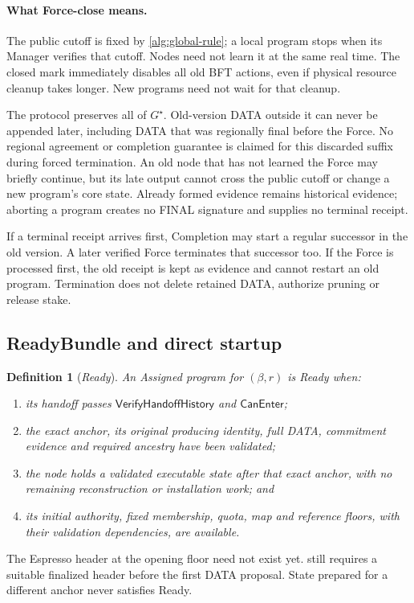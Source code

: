 \documentclass[11pt,a4paper]{article}
\newcommand{\tagg}[1]{\ensuremath{\mathsf{#1}}}
\newcommand{\defterm}[1]{\textcolor{rrBlue}{\textit{#1}}}
\newtheorem{definition}{Definition}[section]
\newcounter{protocol}
\begin{document}
\paragraph{What Force-close means.}
\label{sec:force-close}
The public cutoff is fixed by \cref{alg:global-rule}; a local program
stops when its Manager verifies that cutoff. Nodes need not learn it
at the same real time. The closed mark immediately disables all old
BFT actions, even if physical resource cleanup takes longer. New
programs need not wait for that cleanup.

The protocol preserves all of $G^\star$. Old-version DATA outside it
can never be appended later, including DATA that was regionally final
before the Force. No regional agreement or completion guarantee is
claimed for this discarded suffix during forced termination. An old
node that has not learned the Force may briefly continue, but its late
output cannot cross the public cutoff or change a new program's core
state. Already formed evidence remains historical evidence; aborting a
program creates no FINAL signature and supplies no terminal receipt.

If a terminal receipt arrives first, Completion may start a regular
successor in the old version. A later verified Force terminates that
successor too. If the Force is processed first, the old receipt is kept
as evidence and cannot restart an old program. Termination does not
delete retained DATA, authorize pruning or release stake.

\subsection{ReadyBundle and direct startup}
\label{sec:ready}
\begin{definition}[\defterm{Ready}]
\label{def:ready}
An Assigned program for $(\beta,r)$ is Ready when:
\begin{enumerate}[label=(\roman*),itemsep=2pt]
\item its handoff passes \tagg{VerifyHandoffHistory} and
\tagg{CanEnter};
\item the exact anchor, its original producing identity, full DATA,
commitment evidence and required ancestry have been validated;
\item the node holds a validated executable state after that exact
anchor, with no remaining reconstruction or installation work; and
\item its initial authority, fixed membership, quota, map and reference
floors, with their validation dependencies, are available.
\end{enumerate}
\end{definition}
The Espresso header at the opening floor need not exist yet.
 still requires a suitable finalized header before the
first DATA proposal. State prepared for a different anchor never
satisfies Ready.
\end{document}
